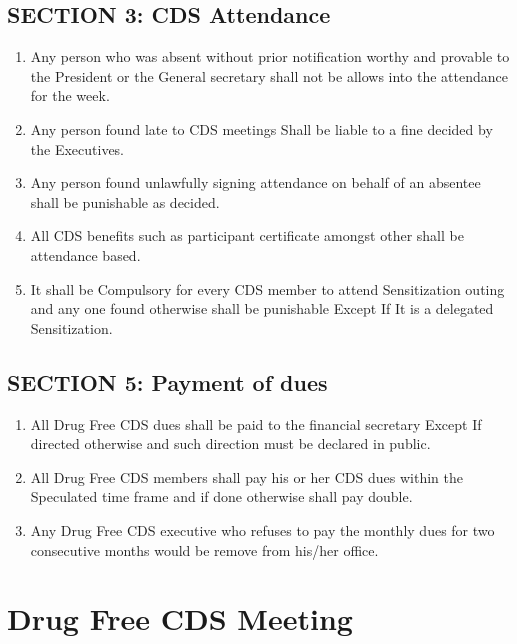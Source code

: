 \documentclass{report}
\begin{document}
\section{SECTION 3: CDS Attendance}
\begin{enumerate}[label = \Alph*. ] 
    \item Any person who was absent without prior notification worthy and provable to the President or the General secretary shall not be allows into the attendance for the week.
    
    \item Any person  found late to CDS meetings Shall be liable to a fine decided by the Executives. 
    
    \item Any person found unlawfully signing attendance on behalf of an absentee shall be punishable as decided.
    
    \item All CDS benefits such as participant certificate amongst other shall be attendance based. 
    
    \item It shall be Compulsory for every CDS member to attend Sensitization outing and any one found otherwise shall be punishable Except If It is a delegated Sensitization.
\end{enumerate}

\section{SECTION 5: Payment of dues}
\begin{enumerate}[label = \Alph*. ] 
    \item All Drug Free CDS dues shall be paid to the financial secretary Except If directed otherwise and such direction must be declared in public.
    
    \item All Drug Free CDS members shall pay his or her CDS dues within the Speculated time frame and if done otherwise shall pay double.
    
    \item Any Drug Free CDS executive who refuses to pay the monthly dues for two consecutive months would be remove from his/her office.
\end{enumerate}

\chapter{Drug Free CDS Meeting}
\end{document}
